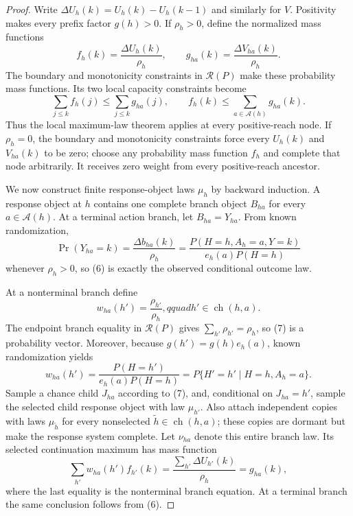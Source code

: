 \documentclass{article}
\begin{document}
\begin{proof}
Write \(\Delta U_h(k)=U_h(k)-U_h(k-1)\) and similarly for \(V\).  Positivity makes every prefix factor \(g(h)>0\).  If \(\rho_h>0\), define the normalized mass functions
\[
 f_h(k)=\frac{\Delta U_h(k)}{\rho_h},
 \qquad
 g_{ha}(k)=\frac{\Delta V_{ha}(k)}{\rho_h}.                \tag{4}
\]
The boundary and monotonicity constraints in \(\mathcal R(P)\) make these probability mass functions.  Its two local capacity constraints become
\[
 \sum_{j\leq k}f_h(j)\leq\sum_{j\leq k}g_{ha}(j),
 \qquad
 f_h(k)\leq\sum_{a\in\mathcal A(h)}g_{ha}(k).             \tag{5}
\]
Thus the local maximum-law theorem applies at every positive-reach node.  If \(\rho_h=0\), the boundary and monotonicity constraints force every \(U_h(k)\) and \(V_{ha}(k)\) to be zero; choose any probability mass function \(f_h\) and complete that node arbitrarily.  It receives zero weight from every positive-reach ancestor.

We now construct finite response-object laws \(\mu_h\) by backward induction.  A response object at \(h\) contains one complete branch object \(B_{ha}\) for every \(a\in\mathcal A(h)\).  At a terminal action branch, let \(B_{ha}=Y_{ha}\).  From known randomization,
\[
 \Pr(Y_{ha}=k)
 =\frac{\Delta b_{ha}(k)}{\rho_h}
 =\frac{P(H=h,A_h=a,Y=k)}{e_h(a)P(H=h)}                  \tag{6}
\]
whenever \(\rho_h>0\), so (6) is exactly the observed conditional outcome law.

At a nonterminal branch define
\[
 w_{ha}(h')=\frac{\rho_{h'}}{\rho_h},qquad
 h'\in\operatorname{ch}(h,a).                            \tag{7}
\]
The endpoint branch equality in \(\mathcal R(P)\) gives \(\sum_{h'}\rho_{h'}=\rho_h\), so (7) is a probability vector.  Moreover, because \(g(h')=g(h)e_h(a)\), known randomization yields
\[
 w_{ha}(h')
 =\frac{P(H=h')}{e_h(a)P(H=h)}
 =P\{H'=h'\mid H=h,A_h=a\}.                              \tag{8}
\]
Sample a chance child \(J_{ha}\) according to (7), and, conditional on \(J_{ha}=h'\), sample the selected child response object with law \(\mu_{h'}\).  Also attach independent copies with laws \(\mu_{\tilde h}\) for every nonselected \(\tilde h\in\operatorname{ch}(h,a)\); these copies are dormant but make the response system complete.  Let \(\nu_{ha}\) denote this entire branch law.  Its selected continuation maximum has mass function
\[
 \sum_{h'}w_{ha}(h')f_{h'}(k)
 =\frac{\sum_{h'}\Delta U_{h'}(k)}{\rho_h}
 =g_{ha}(k),                                               \tag{9}
\]
where the last equality is the nonterminal branch equation.  At a terminal branch the same conclusion follows from (6).


\end{proof}
\end{document}

